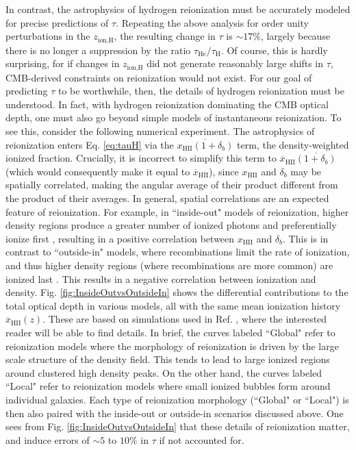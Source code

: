 \documentclass[twocolumn,aps,prd,nofootinbib,showpacs,superscriptaddress]{revtex4-1}
\begin{document}
In contrast, the astrophysics of hydrogen reionization must be accurately modeled for precise predictions of $\tau$. Repeating the above analysis for order unity perturbations in the $z_\textrm{ion,H}$, the resulting change in $\tau$ is $\sim 17\%$, largely because there is no longer a suppression by the ratio $\tau_\textrm{He} / \tau_\textrm{H}$. Of course, this is hardly surprising, for if changes in $z_\textrm{ion,H}$ did not generate reasonably large shifts in $\tau$, CMB-derived constraints on reionization would not exist. For our goal of predicting $\tau$ to be worthwhile, then, the details of hydrogen reionization must be understood. In fact, with hydrogen reionization dominating the CMB optical depth, one must also go beyond simple models of instantaneous reionization. To see this, consider the following numerical experiment. The astrophysics of reionization enters Eq. \eqref{eq:tauH} via the $\overline{x_\textrm{HII} (1+\delta_b)}$ term, the density-weighted ionized fraction. Crucially, it is incorrect to simplify this term to $\overline{x}_\textrm{HII}\overline{ (1+\delta_b)}$ (which would consequently make it equal to $\overline{x}_\textrm{HII}$), since $x_\textrm{HII}$ and $\delta_b$ may be spatially correlated, making the angular average of their product different from the product of their averages. In general, spatial correlations are an expected feature of reionization. For example, in ``inside-out" models of reionization, higher density regions produce a greater number of ionized photons and preferentially ionize first \cite{barkana_and_loeb2004,furlanetto_et_al2006}, resulting in a positive correlation between $x_\textrm{HII}$ and $\delta_b$. This is in contrast to ``outside-in" models, where recombinations limit the rate of ionization, and thus higher density regions (where recombinations are more common) are ionized last \cite{Miralda-Escude_et_al2000}. This results in a negative correlation between ionization and density. Fig. \ref{fig:InsideOutvsOutsideIn} shows the differential contributions to the total optical depth in various models, all with the same mean ionization history $\overline{x}_\textrm{HII} (z) $. These are based on simulations used in Ref. \cite{watkinson_and_pritchard2014}, where the interested reader will be able to find details. In brief, the curves labeled ``Global" refer to reionization models where the morphology of reionization is driven by the large scale structure of the density field. This tends to lead to large ionized regions around clustered high density peaks. On the other hand, the curves labeled ``Local" refer to reionization models where small ionized bubbles form around individual galaxies. Each type of reionization morphology (``Global" or ``Local") is then also paired with the inside-out or outside-in scenarios discussed above. One sees from Fig. \ref{fig:InsideOutvsOutsideIn} that these details of reionization matter, and induce errors of $\sim 5$ to $10\%$ in $\tau$ if not accounted for.
\end{document}
